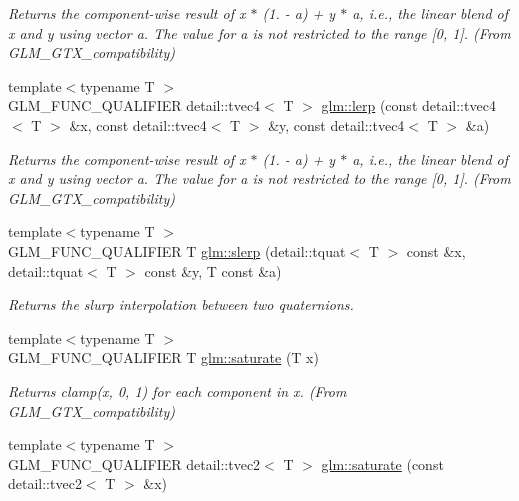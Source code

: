 \begin{DoxyCompactItemize}
\begin{DoxyCompactList}\small\item\em Returns the component-\/wise result of x $\ast$ (1. -\/ a) + y $\ast$ a, i.\+e., the linear blend of x and y using vector a. The value for a is not restricted to the range \mbox{[}0, 1\mbox{]}. (From G\+L\+M\+\_\+\+G\+T\+X\+\_\+compatibility) \end{DoxyCompactList}\item 
\hypertarget{group__gtx__compatibility_ga4f8591445ad6b900b0456dc2d01f8ee4}{}{\footnotesize template$<$typename T $>$ }\\G\+L\+M\+\_\+\+F\+U\+N\+C\+\_\+\+Q\+U\+A\+L\+I\+F\+I\+E\+R detail\+::tvec4$<$ T $>$ \hyperlink{group__gtx__compatibility_ga4f8591445ad6b900b0456dc2d01f8ee4}{glm\+::lerp} (const detail\+::tvec4$<$ T $>$ \&x, const detail\+::tvec4$<$ T $>$ \&y, const detail\+::tvec4$<$ T $>$ \&a)\label{group__gtx__compatibility_ga4f8591445ad6b900b0456dc2d01f8ee4}

\begin{DoxyCompactList}\small\item\em Returns the component-\/wise result of x $\ast$ (1. -\/ a) + y $\ast$ a, i.\+e., the linear blend of x and y using vector a. The value for a is not restricted to the range \mbox{[}0, 1\mbox{]}. (From G\+L\+M\+\_\+\+G\+T\+X\+\_\+compatibility) \end{DoxyCompactList}\item 
{\footnotesize template$<$typename T $>$ }\\G\+L\+M\+\_\+\+F\+U\+N\+C\+\_\+\+Q\+U\+A\+L\+I\+F\+I\+E\+R T \hyperlink{group__gtx__compatibility_gaa299989529dc364bf823ed340f92d1d0}{glm\+::slerp} (detail\+::tquat$<$ T $>$ const \&x, detail\+::tquat$<$ T $>$ const \&y, T const \&a)
\begin{DoxyCompactList}\small\item\em Returns the slurp interpolation between two quaternions. \end{DoxyCompactList}\item 
\hypertarget{group__gtx__compatibility_ga744b98814a35336e25cc0d1ba30f63f7}{}{\footnotesize template$<$typename T $>$ }\\G\+L\+M\+\_\+\+F\+U\+N\+C\+\_\+\+Q\+U\+A\+L\+I\+F\+I\+E\+R T \hyperlink{group__gtx__compatibility_ga744b98814a35336e25cc0d1ba30f63f7}{glm\+::saturate} (T x)\label{group__gtx__compatibility_ga744b98814a35336e25cc0d1ba30f63f7}

\begin{DoxyCompactList}\small\item\em Returns clamp(x, 0, 1) for each component in x. (From G\+L\+M\+\_\+\+G\+T\+X\+\_\+compatibility) \end{DoxyCompactList}\item 
\hypertarget{group__gtx__compatibility_ga79ae98d7b28ae3095a653258b5aa2d9d}{}{\footnotesize template$<$typename T $>$ }\\G\+L\+M\+\_\+\+F\+U\+N\+C\+\_\+\+Q\+U\+A\+L\+I\+F\+I\+E\+R detail\+::tvec2$<$ T $>$ \hyperlink{group__gtx__compatibility_ga79ae98d7b28ae3095a653258b5aa2d9d}{glm\+::saturate} (const detail\+::tvec2$<$ T $>$ \&x)\label{group__gtx__compatibility_ga79ae98d7b28ae3095a653258b5aa2d9d}


\end{DoxyCompactItemize}
